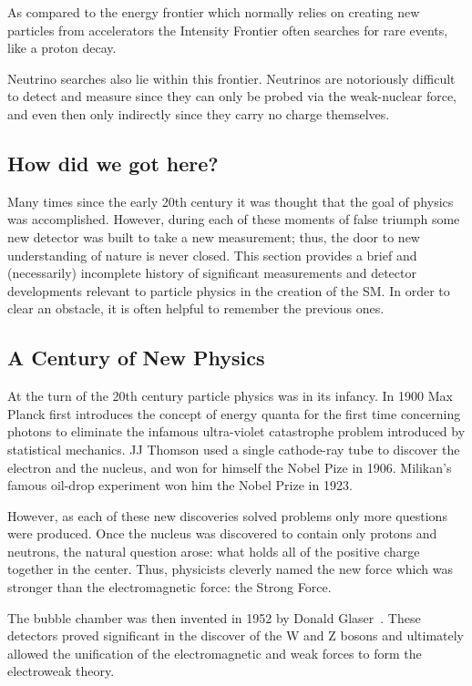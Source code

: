 As compared to the energy frontier which normally relies on creating new particles from accelerators the Intensity Frontier often searches for rare events, like a proton decay.

Neutrino searches also lie within this frontier.
Neutrinos are notoriously difficult to detect and measure since they can only be probed via the weak-nuclear force, and even then only indirectly since they carry no charge themselves.

\subsection{How did we got here?}

Many times since the early 20th century it was thought that the goal of physics was accomplished.
However, during each of these moments of false triumph some new detector was built to take a new measurement; thus, the door to new understanding of nature is never closed.
This section provides a brief and (necessarily) incomplete history of significant measurements and detector developments relevant to particle physics in the creation of the SM.
In order to clear an obstacle, it is often helpful to remember the previous ones.


\subsection{A Century of New Physics}

At the turn of the 20th century particle physics was in its infancy.
In 1900 Max Planck first introduces the concept of energy quanta for the first time concerning photons to eliminate the infamous ultra-violet catastrophe problem introduced by statistical mechanics.
JJ Thomson used a single cathode-ray tube to discover the electron and the nucleus, and won for himself the Nobel Pize in 1906.
Milikan's famous oil-drop experiment won him the Nobel Prize in 1923.

However, as each of these new discoveries solved problems only more questions were produced.
Once the nucleus was discovered to contain only protons and neutrons, the natural question arose: what holds all of the positive charge together in the center.
Thus, physicists cleverly named the new force which was stronger than the electromagnetic force: the Strong Force.

The bubble chamber was then invented in 1952 by Donald Glaser~\citep{bubbleChamber_PhysRev.87.665}.
These detectors proved significant in the discover of the W and Z bosons and ultimately allowed the unification of the electromagnetic and weak forces to form the electroweak theory.

